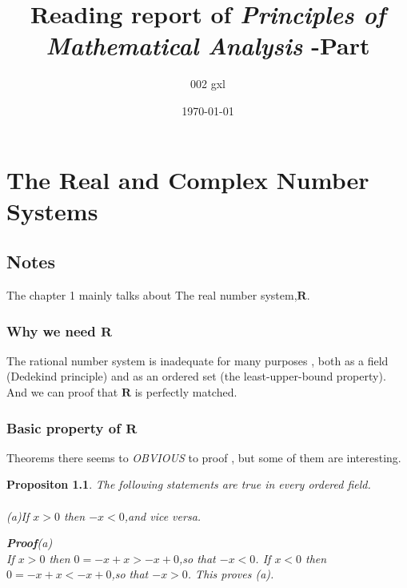 \documentclass{report}
\title
{Reading report of 
\emph{Principles of Mathematical Analysis}
-Part \uppercase\expandafter{\romannumeral1}}
\author{002 gxl}
\date{\today}
\newtheorem{mypro}{Propositon}
\begin{document}
    \maketitle
    \chapter[Chapter]{The Real and Complex Number Systems}
        \section{Notes}
            The chapter 1 mainly talks about The real 
            number system,$\mathbf{R}$. 
            \subsection{Why we need $\mathbf{R}$}
                The rational number system is inadequate for many purposes , 
                both as a field (Dedekind principle) 
                and as an ordered set (the least-upper-bound property).
                And we can proof that 
                $\mathbf{R}$ is perfectly matched.
            \subsection{Basic property of $\mathbf{R}$}
                Theorems there seems to \emph{OBVIOUS}  to proof , but 
                some of them are interesting.
                \begin{mypro}
                    The following statements are true in every ordered field.\\
                    \\
                    (a)\quad If $x>0$ then $-x<0$,and vice versa.\\
                    
                \begin{flushleft}
                    \textbf{Proof}(a)\\
                If $x>0$ then $0=-x+x>-x+0$,so that $-x<0$.
                If $x<0$ then $0=-x+x<-x+0$,so that $-x>0$.
                This proves (a).
                \end{flushleft}
                
                \end{mypro}
\end{document}
